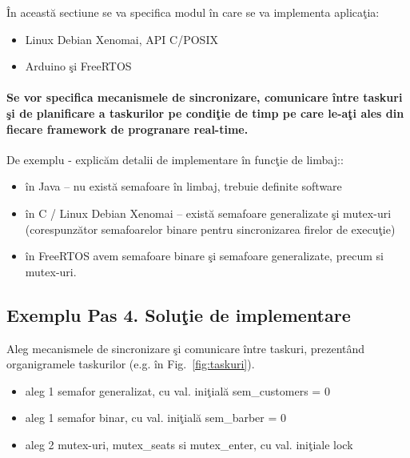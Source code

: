 \documentclass[a4paper, 11pt]{article}
\begin{document}
\^{I}n aceast\u{a} sectiune se va specifica modul \^{i}n care se va implementa aplica\c{t}ia:
\begin{itemize}
\item Linux Debian Xenomai, API C/POSIX
\item Arduino \c{s}i FreeRTOS
\end{itemize}

\paragraph{Se vor specifica mecanismele de sincronizare, comunicare \^{i}ntre taskuri \c{s}i de planificare a taskurilor pe condi\c{t}ie de timp pe care le-a\c{t}i ales din fiecare framework de progranare real-time.} De exemplu - explic\u{a}m detalii de implementare \^{i}n func\c{t}ie de limbaj:: 

\begin{itemize}
\item \^{i}n Java – nu exist\u{a} semafoare \^{i}n limbaj, trebuie definite software
\item \^{i}n C / Linux Debian Xenomai – exist\u{a} semafoare generalizate \c{s}i mutex-uri (corespunz\u{a}tor semafoarelor binare pentru sincronizarea firelor de execu\c{t}ie) 
\item \^{i}n FreeRTOS avem semafoare binare \c{s}i semafoare generalizate, precum si mutex-uri. 
\end{itemize}

\subsection*{Exemplu Pas 4. Solu\c{t}ie de implementare}

Aleg mecanismele de sincronizare \c{s}i comunicare \^{i}ntre taskuri, prezent\^{a}nd organigramele taskurilor (e.g. \^{i}n Fig.~\ref{fig:taskuri}).

\begin{itemize}
\item aleg 1 semafor generalizat, cu val. ini\c{t}ial\u{a} sem\_customers = 0
\item aleg 1 semafor binar, cu val. ini\c{t}ial\u{a} sem\_barber = 0
\item aleg 2 mutex-uri, mutex\_seats si mutex\_enter, cu val. ini\c{t}iale lock
\end{itemize}
\end{document}
